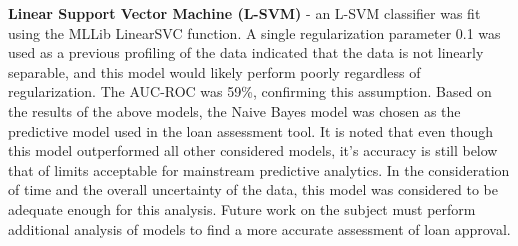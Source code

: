 \documentclass[conference,compsoc]{IEEEtran}
\begin{document}
\textbf{Linear Support Vector Machine (L-SVM)} - an L-SVM classifier was fit using the MLLib LinearSVC function. A single regularization parameter 0.1 was used as a previous profiling of the data indicated that the data is not linearly separable, and this model would likely perform poorly regardless of regularization. The AUC-ROC was 59\%, confirming this assumption.
Based on the results of the above models, the Naive Bayes model was chosen as the predictive model used in the loan assessment tool. It is noted that even though this model outperformed all other considered models, it’s accuracy is still below that of limits acceptable for mainstream predictive analytics. In the consideration of time and the overall uncertainty of the data, this model was considered to be adequate enough for this analysis. Future work on the subject must perform additional analysis of models to find a more accurate assessment of loan approval.


%
%

\end{document}
